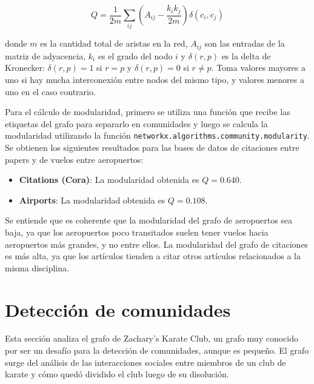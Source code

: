 \documentclass{article}
\begin{document}
\begin{equation}
    \label{eq: modularity}
    Q = \frac{1}{2m} \sum_{ij} \left(A_{ij} -\frac{k_ik_j}{2m} \right)\delta(c_i,c_j)
\end{equation}

donde $m$ es la cantidad total de aristas en la red, $A_{ij}$ son las entradas de la matriz de adyacencia, $k_i$ es el grado del nodo $i$ y $\delta(r,p)$ es la delta de Kronecker: $\delta(r,p) = 1$ si $r=p$ y $\delta(r,p) = 0$ si $r\neq p$. Toma valores mayores a uno si hay mucha interconexión entre nodos del mismo tipo, y valores menores a uno en el caso contrario.



Para el cálculo de modularidad, primero se utiliza una función que recibe las etiquetas del grafo para separarlo en comunidades y luego se calcula la modularidad utilizando la función \verb|networkx.algorithms.community.modularity|. Se obtienen los siguientes resultados para las bases de datos de citaciones entre papers y de vuelos entre aeropuertos:
\begin{itemize}
    \item \textbf{Citations (Cora)}: La modularidad obtenida es $Q = 0.640$.
    \item \textbf{Airports}: La modularidad obtenida es $Q = 0.108$.
\end{itemize}

Se entiende que es coherente que la modularidad del grafo de aeropuertos sea baja, ya que los aeropuertos poco transitados suelen tener vuelos hacia aeropuertos más grandes, y no entre ellos. La modularidad del grafo de citaciones es más alta, ya que los artículos tienden a citar otros artículos relacionados a la misma disciplina.

\section{Detección de comunidades} \label{sec: comunidades}


Esta sección analiza el grafo de Zachary's Karate Club, un grafo muy conocido por ser un desafío para la detección de comunidades, aunque es pequeño. El grafo surge del análisis de las interacciones sociales entre miembros de un club de karate y cómo quedó dividido el club luego de su disolución.
\end{document}

